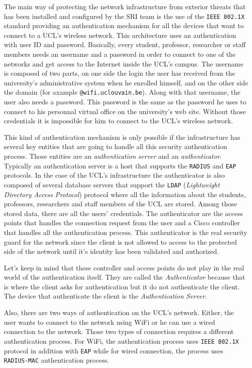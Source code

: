 The main way of protecting the network infrastructure from exterior threats that has been installed and configured by the SRI team is the use of the \texttt{IEEE 802.1X} standard providing an authentication mechanism for all the devices that want to connect to a UCL's wireless network. This architecture uses an authentication with user ID and password. Basically, every student, professor, researcher or staff members needs an username and a password in order to connect to one of the networks and get access to the Internet inside the UCL's campus. The username is composed of two parts, on one side the login the user has received from the university's administrative system when he enrolled himself, and on the other side the domain (for axample \texttt{@wifi.uclouvain.be}). Along with that username, the user also needs a password. This password is the same as the password he uses to connect to his personnal virtual office on the university's web site. Without those credentials it is impossible for him to connect to the UCL's wireless network.

This kind of authentication mechanism is only possible if the infrastructure has several key entities that are going to handle all this security authentication process. Those entities are an \textit{authentication server} and an \textit{authenticator}. Typically an authentication server is a host that supports the \texttt{RADIUS} and  \texttt{EAP} protocols. In the case of the UCL's infrastructure the authenticator is also composed of several database servers that support the \texttt{LDAP} (\textit{Lightweight Directory Access Protocol}) protocol where all the information about the students, professors, researchers and staff members of the UCL are stored. Among those stored data, there are all the users' credentials. The authenticator are the access points that handles the connection request from the user and a Cisco controller that handles all the authentication process. This authenticator is the real security guard for the network since the client is not allowed to access to the protected side of the network until it's identity has been validated and authorized.

Let's keep in mind that these controller and access points do not play in the real world of the authentication itself. They are called the \textit{Authenticator} because that is where the client asks for authentication but it do not authenticate the client. The device that authenticate the client is the \textit{Authentication Server}.

Also, there are two ways of authentication on the UCL's network. Either, the user wants to connect to the network using WiFi or he can use a wired connection to the network. Those two types of connection requires a different authentication process. For WiFi, the authentication process uses \texttt{IEEE 802.1X} protocol in addition with \texttt{EAP} while for wired connection, the process uses \texttt{RADIUS-MAC} authentication process. 


